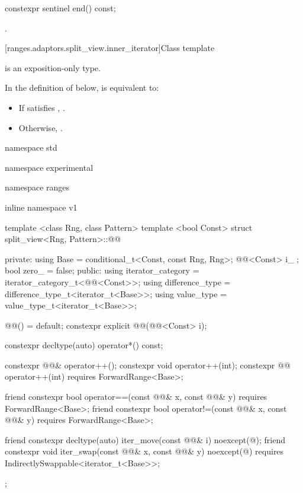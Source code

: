 %
\begin{itemdecl}
constexpr sentinel end() const;
\end{itemdecl}

\begin{itemdescr}
\pnum
\returns {}.
\end{itemdescr}

[ranges.adaptors.split_view.inner_iterator]{Class template }

\pnum
\enternote {} is an exposition-only type.\exitnote

\pnum
In the definition of  below,
 is equivalent to:
\begin{itemize}
\item If  satisfies , .
\item Otherwise, .
\end{itemize}

\begin{codeblock}
namespace std { namespace experimental { namespace ranges { inline namespace v1 {
  template <class Rng, class Pattern>
  template <bool Const>
  struct split_view<Rng, Pattern>::@@ {
  private:
    using Base = conditional_t<Const, const Rng, Rng>;
    @@<Const> i_ {};
    bool zero_ = false;
  public:
    using iterator_category = iterator_category_t<@@<Const>>;
    using difference_type = difference_type_t<iterator_t<Base>>;
    using value_type = value_type_t<iterator_t<Base>>;

    @@() = default;
    constexpr explicit @@(@@<Const> i);

    constexpr decltype(auto) operator*() const;

    constexpr @@& operator++();
    constexpr void operator++(int);
    constexpr @@ operator++(int) requires ForwardRange<Base>;

    friend constexpr bool operator==(const @@& x, const @@& y)
      requires ForwardRange<Base>;
    friend constexpr bool operator!=(const @@& x, const @@& y)
      requires ForwardRange<Base>;

    friend constexpr decltype(auto) iter_move(const @@& i)
      noexcept(@\seebelow@);
    friend constexpr void iter_swap(const @@& x, const @@& y)
      noexcept(@\seebelow@) requires IndirectlySwappable<iterator_t<Base>>;
  };
}}}}
\end{codeblock}

